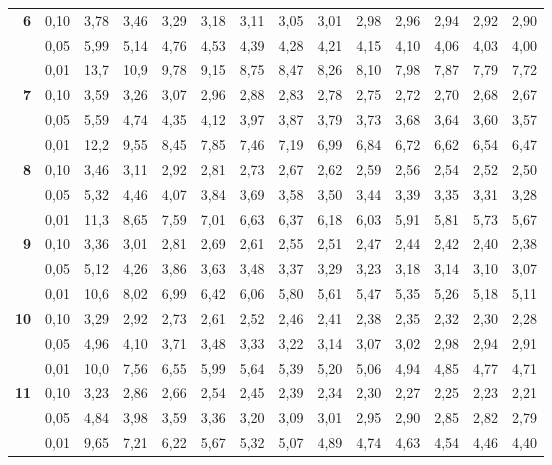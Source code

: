 \documentclass[12pt,a4paper]{article}
\begin{document}
{\begin{longtable}{@{\extracolsep{\fill}}rrrrrrrrrrrrrr@{}}
\addlinespace[1pt]
\textbf{6} & 0,10 & 3,78 & 3,46 & 3,29 & 3,18 & 3,11 & 3,05 & 3,01 & 2,98 & 2,96 & 2,94 & 2,92 & 2,90 \\*
 & 0,05 & 5,99 & 5,14 & 4,76 & 4,53 & 4,39 & 4,28 & 4,21 & 4,15 & 4,10 & 4,06 & 4,03 & 4,00 \\*
 & 0,01 & 13,7 & 10,9 & 9,78 & 9,15 & 8,75 & 8,47 & 8,26 & 8,10 & 7,98 & 7,87 & 7,79 & 7,72 \\
\addlinespace[1pt]
\textbf{7} & 0,10 & 3,59 & 3,26 & 3,07 & 2,96 & 2,88 & 2,83 & 2,78 & 2,75 & 2,72 & 2,70 & 2,68 & 2,67 \\*
 & 0,05 & 5,59 & 4,74 & 4,35 & 4,12 & 3,97 & 3,87 & 3,79 & 3,73 & 3,68 & 3,64 & 3,60 & 3,57 \\*
 & 0,01 & 12,2 & 9,55 & 8,45 & 7,85 & 7,46 & 7,19 & 6,99 & 6,84 & 6,72 & 6,62 & 6,54 & 6,47 \\
\addlinespace[1pt]
\textbf{8} & 0,10 & 3,46 & 3,11 & 2,92 & 2,81 & 2,73 & 2,67 & 2,62 & 2,59 & 2,56 & 2,54 & 2,52 & 2,50 \\*
 & 0,05 & 5,32 & 4,46 & 4,07 & 3,84 & 3,69 & 3,58 & 3,50 & 3,44 & 3,39 & 3,35 & 3,31 & 3,28 \\*
 & 0,01 & 11,3 & 8,65 & 7,59 & 7,01 & 6,63 & 6,37 & 6,18 & 6,03 & 5,91 & 5,81 & 5,73 & 5,67 \\
\addlinespace[1pt]
\textbf{9} & 0,10 & 3,36 & 3,01 & 2,81 & 2,69 & 2,61 & 2,55 & 2,51 & 2,47 & 2,44 & 2,42 & 2,40 & 2,38 \\*
 & 0,05 & 5,12 & 4,26 & 3,86 & 3,63 & 3,48 & 3,37 & 3,29 & 3,23 & 3,18 & 3,14 & 3,10 & 3,07 \\*
 & 0,01 & 10,6 & 8,02 & 6,99 & 6,42 & 6,06 & 5,80 & 5,61 & 5,47 & 5,35 & 5,26 & 5,18 & 5,11 \\
\addlinespace[1pt]
\textbf{10} & 0,10 & 3,29 & 2,92 & 2,73 & 2,61 & 2,52 & 2,46 & 2,41 & 2,38 & 2,35 & 2,32 & 2,30 & 2,28 \\*
 & 0,05 & 4,96 & 4,10 & 3,71 & 3,48 & 3,33 & 3,22 & 3,14 & 3,07 & 3,02 & 2,98 & 2,94 & 2,91 \\*
 & 0,01 & 10,0 & 7,56 & 6,55 & 5,99 & 5,64 & 5,39 & 5,20 & 5,06 & 4,94 & 4,85 & 4,77 & 4,71 \\
\addlinespace[1pt]
\textbf{11} & 0,10 & 3,23 & 2,86 & 2,66 & 2,54 & 2,45 & 2,39 & 2,34 & 2,30 & 2,27 & 2,25 & 2,23 & 2,21 \\*
 & 0,05 & 4,84 & 3,98 & 3,59 & 3,36 & 3,20 & 3,09 & 3,01 & 2,95 & 2,90 & 2,85 & 2,82 & 2,79 \\*
 & 0,01 & 9,65 & 7,21 & 6,22 & 5,67 & 5,32 & 5,07 & 4,89 & 4,74 & 4,63 & 4,54 & 4,46 & 4,40 \\

\end{longtable}}
\end{document}
